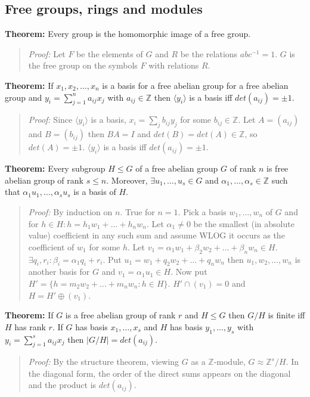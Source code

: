 \subsection{Free groups, rings and modules}
{\bf Theorem:}
Every group is the homomorphic image of a free group.
\begin{quote}
\emph{Proof:}
Let $F$ be the elements of $G$ and $R$ be the relations $abc^{-1}=1$.
$G$ is the free group on the symbols $F$ with relations $R$.
\end{quote}
{\bf Theorem:}
If $x_1, x_2, \ldots , x_n$ is a basis for a free abelian group for a free abelian
group and $y_i = \sum_{j=1}^n a_{ij} x_j$ with $a_{ij} \in {\mathbb Z}$ then
$\langle y_i \rangle$ is a basis iff $det(a_{ij}) = \pm 1$.
\begin{quote}
\emph{Proof:}  
Since $\langle y_i \rangle$ is a basis, $x_i= \sum_j b_{ij} y_j$ for some
$b_{ij} \in {\mathbb Z}$.  Let $A= (a_{ij})$ and $B= (b_{ij})$ then
$BA=I$ and $det(B)= det(A) \in {\mathbb Z}$, so $det(A)= \pm 1$.
$\langle y_i \rangle$ is a basis iff $det(a_{ij}) = \pm 1$.
\end{quote}
{\bf Theorem:}
Every subgroup $H \le G$ of a free abelian group $G$ of rank $n$ is free abelian group
of rank $s \le n$.  Moreover, $\exists  u_1, \ldots, u_s \in G$ and 
$\alpha_1, \ldots, \alpha_s \in {\mathbb Z}$ such that $\alpha_1 u_1 , \ldots, \alpha_s u_s$
is a basis of $H$.
\begin{quote}
\emph{Proof:}  
By induction on $n$.  True for $n=1$.  Pick a basis $w_1, \ldots, w_n$ of $G$ and
for $h \in H: h= h_1 w_1 + \ldots + h_n w_n$.  Let $\alpha_1 \ne 0$ be the
smallest (in absolute value) coefficient in any such sum and assume WLOG it occurs as the coefficient of $w_1$ for
some $h$.
Let $v_1= \alpha_1 w_1 + \beta_2 w_2 + \ldots + \beta_n w_n \in H$. $\exists q_i, r_i:
\beta_i = \alpha_1 q_i + r_i$.  Put $u_1 = w_1 + q_2 w_2 + \ldots + q_n w_n$ then
$u_1, w_2 , \ldots , w_n$ is another basis for $G$ and $v_1= \alpha_1 u_1 \in H$.
Now put $H'= \{ h= m_2 w_2 + \ldots + m_n w_n: h \in H \}$.  $H' \cap (v_1) = 0$
and $H= H' \oplus (v_1)$.
\end{quote}
{\bf Theorem:}
If $G$ is a free abelian group of rank $r$ and $H \le G$ then $G/H$ is finite iff
$H$ has rank $r$.  If $G$ has basis $x_1, \ldots , x_s$ and $H$ has basis
$y_1, \ldots, y_s$ with $y_i= \sum_{j=1}^s a_{ij} x_j$ then $|G/H|= det(a_{ij})$.
\begin{quote}
\emph{Proof:}  
By the structure theorem, viewing $G$ as a ${\mathbb Z}$-module,
$G \approx {\mathbb Z}^s/H$.  In the diagonal form, the order of the direct sums appears
on the diagonal and the product is $det(a_{ij})$.
\end{quote}
